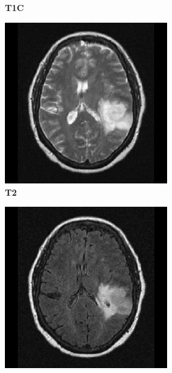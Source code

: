 \begin{subappendices}
\begin{figure}
\begin{subfigure}[b]{0.77\textwidth}
\begin{subfigure}[b]{0.24\textwidth}
        \caption*{\normalfont \textbf{\acrshort{T1C}}\nopunct}
        \end{subfigure}
        \hfill
        \begin{subfigure}[b]{0.24\textwidth}
        \includegraphics[width=\textwidth]{Figures/TCGA-DU-6400_T2.png}
        \caption*{\normalfont \textbf{\acrshort{T2}}\nopunct}
        \end{subfigure}
        \hfill
        \begin{subfigure}[b]{0.24\textwidth}
        \includegraphics[width=\textwidth]{Figures/TCGA-DU-6400_FLAIR.png}

\end{subfigure}
\end{subfigure}
\end{figure}
\end{subappendices}

